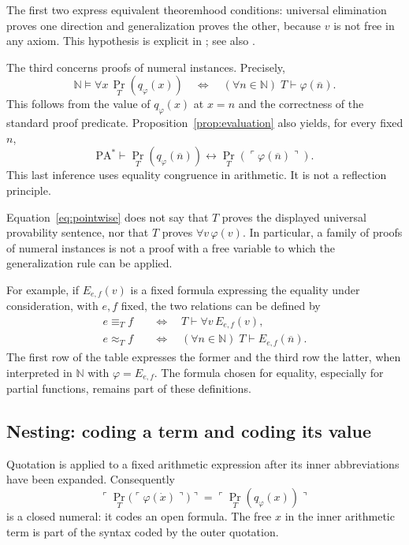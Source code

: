 \documentclass[11pt]{article}
\newcommand{\N}{\mathbb N}
\newcommand{\PA}{\mathrm{PA}^{*}}
\newcommand{\Prov}{\operatorname{Pr}}
\newcommand{\quo}[1]{\ulcorner #1\urcorner}
\newcommand{\bn}[1]{\overline{#1}}
\theoremstyle{definition}
\begin{document}
The first two express equivalent theoremhood conditions: universal
elimination proves one direction and generalization proves the other,
because $v$ is not free in any axiom. This hypothesis is explicit in
\cite[\S2(c), Proposition~2.1, p.~45]{F60}; see also
\cite[\S2(b), p.~266]{F62}.

The third concerns proofs of numeral instances. Precisely,
\begin{equation}\label{eq:pointwise}
 \N\models\forall x\,\Prov_T(q_\varphi(x))
 \quad\Longleftrightarrow\quad
 (\forall n\in\N)\;T\vdash\varphi(\bn n).
\end{equation}
This follows from the value of $q_\varphi(x)$ at $x=n$ and the
correctness of the standard proof predicate. Proposition~\ref{prop:evaluation} also
yields, for every fixed $n$,
\[
 \PA\vdash
 \Prov_T(q_\varphi(\bn n))
 \leftrightarrow \Prov_T(\quo{\varphi(\bn n)}).
\]
This last inference uses equality congruence in arithmetic. It is not
a reflection principle.

Equation~\eqref{eq:pointwise} does not say that $T$ proves the
displayed universal provability sentence, nor that $T$ proves
$\forall v\,\varphi(v)$. In particular, a family of proofs of
numeral instances is not a proof with a free variable to which the
generalization rule can be applied.

For example, if $E_{e,f}(v)$ is a fixed formula expressing the equality
under consideration, with $e,f$ fixed, the two relations can be defined by
\begin{align*}
 e\equiv_T f&\quad\Longleftrightarrow\quad
       T\vdash\forall v\,E_{e,f}(v),\\
 e\approx_T f&\quad\Longleftrightarrow\quad
       (\forall n\in\N)\;T\vdash E_{e,f}(\bn n).
\end{align*}
The first row of the table expresses the former and the third row the
latter, when interpreted in $\N$ with $\varphi=E_{e,f}$. The formula
chosen for equality, especially for partial functions, remains part of
these definitions.

\subsection{Nesting: coding a term and coding its value}

Quotation is applied to a fixed arithmetic expression after its inner
abbreviations have been expanded. Consequently
\begin{equation}\label{eq:nesting-closed}
 \quo{\Prov_T\bigl(\quo{\varphi(\dot x)}\bigr)}
   =\quo{\Prov_T(q_\varphi(x))}
\end{equation}
is a closed numeral: it codes an open formula. The free $x$ in the
inner arithmetic term is part of the syntax coded by the outer quotation.
\end{document}

